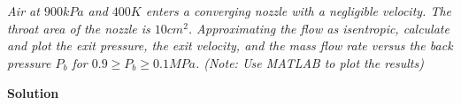 \section{}

\textit{Air at $900 kPa$ and $400 K$ enters a converging nozzle with a negligible velocity. The throat area of the nozzle is $10 cm^2$. Approximating the flow as isentropic, calculate and plot the exit pressure, the exit velocity, and the mass flow rate versus the back pressure $P_b$ for $0.9 \geq P_b \geq 0.1 MPa$. (Note: Use MATLAB to plot the results)}

\textbf{Solution}

